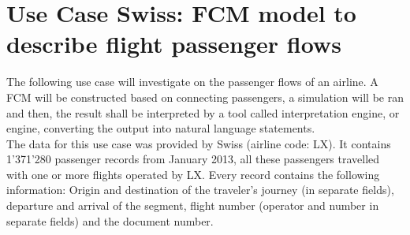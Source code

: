 \documentclass[conference]{IEEEtran}
\begin{document}
\section{Use Case Swiss: FCM model to describe flight passenger flows}
The following use case will investigate on the passenger flows of an airline. A FCM will be constructed based on connecting passengers, a simulation will be ran and then, the result shall be interpreted by a tool called interpretation engine, or engine, converting the output into natural language statements.\\
The data for this use case was provided by Swiss (airline code: LX). It contains 1'371'280 passenger records from January 2013, all these passengers travelled with one or more flights operated by LX. Every record contains the following information: Origin and destination of the traveler's journey (in separate fields), departure and arrival of the segment, flight number (operator and number in separate fields) and the document number.\\
\end{document}
